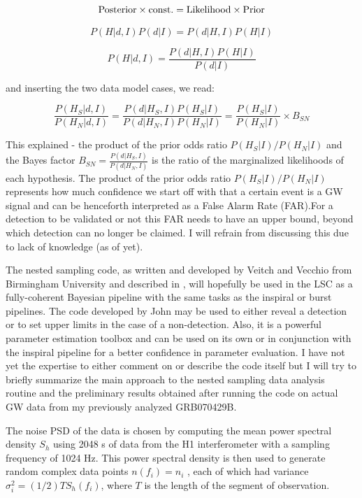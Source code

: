 \documentclass[epsf]{article}
\begin{document}
\begin{equation}
{\rm Posterior} \times {\rm const.} = {\rm Likelihood} \times {\rm Prior}
\end{equation}

\begin{equation}
P(H|d,I)P(d|I)=P(d|H,I)P(H|I)
\end{equation}

\begin{equation}
P(H|d,I) = \frac {P(d|H,I)P(H|I)}{P(d|I)}
\end{equation}

and inserting the two data model cases, we read:

\begin{equation}
\frac {P(H_S|d,I)}{P(H_N|d,I)} =   \frac {P(d|H_S,I)P(H_S|I)} {P(d|H_N,I)P(H_N|I)} = \frac {P(H_S|I)}{P(H_N|I)} \times B_{SN}
\end{equation}

 This explained - the product of the prior odds ratio $P (H_S |I )/P (H_N |I )$ and the Bayes factor $B_{SN}= \frac {P(d|H_S,I)}{P(d|H_N,I)}$ is
the ratio of the marginalized likelihoods of each hypothesis. The product of the prior odds ratio $P (H_S |I )/P (H_N |I )$ represents how much confidence we start off with that a certain event is a GW signal and can be henceforth interpreted as a False Alarm Rate (FAR).For a detection to be validated or not this FAR needs to have an upper bound, beyond which detection can no longer be claimed. I will refrain from discussing this due to lack of knowledge (as of yet).

 The nested sampling code, as written and developed by Veitch and Vecchio \cite{veitch} from Birmingham University and described in \cite{skilling,veitch}, will hopefully be used in the LSC as a fully-coherent Bayesian pipeline with the same tasks as the inspiral or burst pipelines. The code developed by John may be used to either reveal a detection or to set upper limits in the case of a non-detection. Also, it is a powerful parameter estimation toolbox and can be used on its own or in conjunction with the inspiral pipeline for a better confidence in parameter evaluation. I have not yet the expertise to either comment on or describe the code itself but I will try to briefly summarize the main approach to the nested sampling data analysis routine and the preliminary results obtained after running the code on actual GW data from my previously analyzed GRB070429B.

The noise PSD of the data is chosen by computing the mean power
spectral density $S_h$ using 2048 s of data from the H1 interferometer with a sampling frequency
of 1024 Hz. This power spectral density is then used to generate random complex data points
$n(f_i) = n_i$ , each of which had variance $\sigma_i^2 = (1/2) T S_h (f_i )$, where $T$ is the length of the segment of observation.
\end{document}
